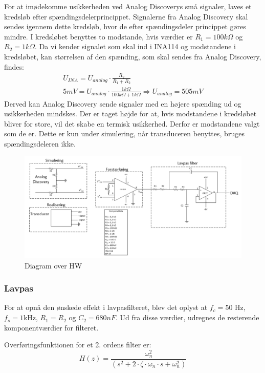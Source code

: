 \newline 
For at imødekomme usikkerheden ved Analog Discoverys små signaler, laves et kredsløb efter spændingsdelerprincippet. Signalerne fra Analog Discovery skal sendes igennem dette kredsløb, hvor de efter spændingsdeler princippet gøres mindre. I kredsløbet benyttes to modstande, hvis værdier er $ R_1=100k\Omega $ og $ R_2 = 1k\Omega $. Da vi kender signalet som skal ind i INA114 og modstandene i kredsløbet, kan størrelsen af den spænding, som skal sendes fra Analog Discovery, findes:
\begin{equation}
\begin{split}
U_{INA} = U_{analog} \cdot \frac{R_2}{R_1 + R_2} \\
5mV = U_{analog}\cdot \frac{1k\Omega}{100k\Omega+1k\Omega} \Rightarrow U_{analog}= 505mV
\end{split}
\end{equation} 
Derved kan Analog Discovery sende signaler med en højere spænding ud og usikkerheden mindskes. Der er taget højde for at, hvis modstandene i kredsløbet bliver for store, vil det skabe en termisk usikkerhed. Derfor er modstandene valgt som de er. Dette er kun under simulering, når transduceren benyttes, bruges spændingsdeleren ikke.  
\begin{figure}[H]
	\centering
	\includegraphics[width=1.0\textwidth]{Figurer/diagram_over_HW}
	\caption{Diagram over HW}
	\label{fig:HW}
\end{figure}

\subsubsection{Lavpas}
For at opnå den ønskede effekt i lavpasfilteret, blev det oplyst at $ f_c=50$ Hz, $ f_s = 1$kHz, $ R_1 = R_2 $ og $ C_2=680 nF$. Ud fra disse værdier, udregnes de resterende komponentværdier for filteret.

Overføringsfunktionen for et 2. ordens filter er: 
\begin{equation}
H(z)=\frac{\omega_n^2}{(s^2 + 2\cdot\zeta \cdot \omega_n \cdot s+\omega_n^2)}
\end{equation}

